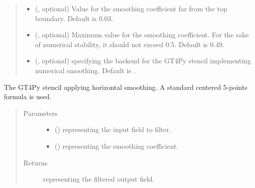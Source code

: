 \documentclass[letterpaper,10pt,english]{sphinxmanual}
\begin{document}
\begin{fulllineitems}
\begin{fulllineitems}
\begin{quote}
\begin{description}
\begin{itemize}
\item {} 
 (, optional) \textendash{} Value for the smoothing coefficient far from the top boundary. Default is 0.03.

\item {} 
 (, optional) \textendash{} Maximum value for the smoothing coefficient. For the sake of numerical stability, it should not
exceed 0.5. Default is 0.49.

\item {} 
 (, optional) \textendash{}  specifying the backend for the GT4Py stencil implementing numerical
smoothing. Default is .

\end{itemize}

\end{description}\end{quote}

\end{fulllineitems}


\begin{fulllineitems}
\label{\detokenize{api:dycore.horizontal_smoothing.HorizontalSmoothingSecondOrderYZ._stencil_defs}}
The GT4Py stencil applying horizontal smoothing. A standard centered 5-points formula is used.
\begin{quote}\begin{description}
\item[{Parameters}] \leavevmode\begin{itemize}
\item {} 
 () \textendash{}  representing the input field to filter.

\item {} 
 () \textendash{}  representing the smoothing coefficient.

\end{itemize}

\item[{Returns}] \leavevmode
{} representing the filtered output field.


\end{description}
\end{quote}
\end{fulllineitems}
\end{fulllineitems}
\end{document}
